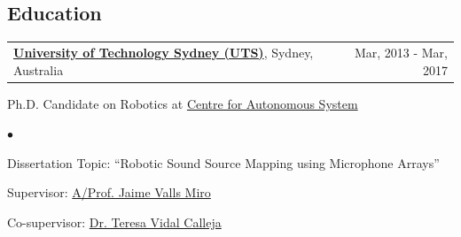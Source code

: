 \documentclass[margin,line]{res}
\newenvironment{list1}{
  \begin{list}{\ding{113}}{%
      \setlength{\itemsep}{0in}
      \setlength{\parsep}{0in} \setlength{\parskip}{0in}
      \setlength{\topsep}{0in} \setlength{\partopsep}{0in} 
      \setlength{\leftmargin}{0.17in}}}{\end{list}}
\newenvironment{list2}{
  \begin{list}{$\bullet$}{%
      \setlength{\itemsep}{0in}
      \setlength{\parsep}{0in} \setlength{\parskip}{0in}
      \setlength{\topsep}{0in} \setlength{\partopsep}{0in} 
      \setlength{\leftmargin}{0.2in}}}{\end{list}}
\begin{document}
\begin{resume}
\section{\sc Education}

\begin{tabularx}{\textwidth}{X r}
\href{http://www.uts.edu.au}{{\bf University of Technology Sydney (UTS)}}, Sydney, Australia  &Mar, 2013 - Mar, 2017\\
\end{tabularx}
\vspace*{-.1in}
\begin{list1}
\item[] Ph.D. Candidate on Robotics at \href{http://www.cas.uts.edu.au}{Centre for Autonomous System}%
\begin{list2}
\vspace*{.05in}
\item Dissertation Topic:  ``Robotic Sound Source Mapping using Microphone Arrays'' 
\item Supervisor: \href{http://www.uts.edu.au/staff/jaime.vallsmiro}{A/Prof. Jaime Valls Miro}
\item Co-supervisor:  \href{http://www.uts.edu.au/staff/teresa.vidalcalleja}{Dr. Teresa Vidal Calleja}
\end{list2}
\end{list1}


\end{resume}
\end{document}
